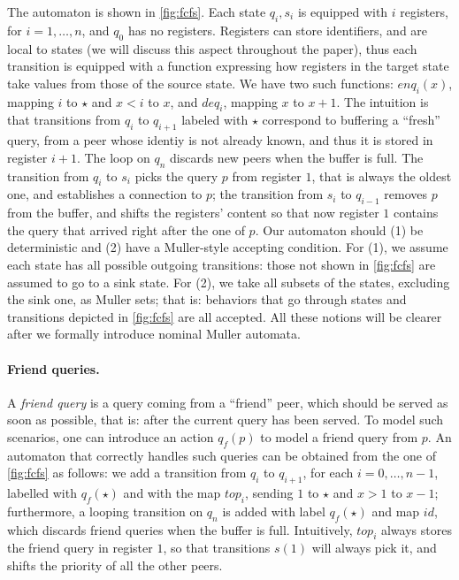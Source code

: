 %
The automaton is shown in \autoref{fig:fcfs}. Each state $q_i,s_i$ is equipped with $i$ registers, for $i=1,\dots,n$, and $q_0$ has no registers. Registers can store identifiers, and are local to states (we will discuss this aspect throughout the paper), thus each transition is equipped with a function expressing how registers in the target state take values from those of the source state. We have two such functions: $enq_i(x)$, mapping $i$ to $\star$ and $x < i$ to $x$, and $deq_i$, mapping $x$ to $x+1$.
%
The intuition is that transitions from $q_i$ to $q_{i+1}$ labeled with $\star$ correspond to buffering a ``fresh'' query, from a peer whose identiy is not already known, and thus it is stored in register $i+1$. The loop on $q_n$ discards new peers when the buffer is full. The transition from $q_i$ to $s_i$ picks the query $p$ from register $1$, that is always the oldest one, and establishes a connection to $p$;
the transition from $s_i$ to $q_{i-1}$ removes $p$ from the buffer, and shifts the registers' content so that now register $1$ contains the query that arrived right after the one of $p$. Our automaton should (1) be deterministic and (2) have a Muller-style accepting condition. For (1), we assume each state has all possible outgoing transitions: those not shown in \autoref{fig:fcfs} are assumed to go to a sink state. For (2), we take all subsets of the states, excluding the sink one, as Muller sets; that is: behaviors that go through states and transitions depicted in \autoref{fig:fcfs} are all accepted. All these notions will be clearer after we formally introduce nominal Muller automata.

%

\paragraph{Friend queries.} A \emph{friend query} is a query coming from a ``friend'' peer, which should be served as soon as possible, that is: after the current query has been served. To model such scenarios, one can introduce an action $q_f(p)$ to model a friend query from $p$. An automaton that correctly handles such queries can be obtained from the one of \autoref{fig:fcfs} as follows: we add a transition from $q_i$ to $q_{i+1}$, for each $i=0,\dots,n-1$, labelled with $q_f(\star)$ and with the map $top_i$, sending $1$ to $\star$ and $x > 1$ to $x-1$; furthermore, a looping transition on $q_n$ is added with label $q_f(\star)$ and map $id$, which discards friend queries when the buffer is full. Intuitively, $top_i$ always stores the friend query in register $1$, so that transitions $s(1)$ will always pick it, and shifts the priority of all the other peers.

